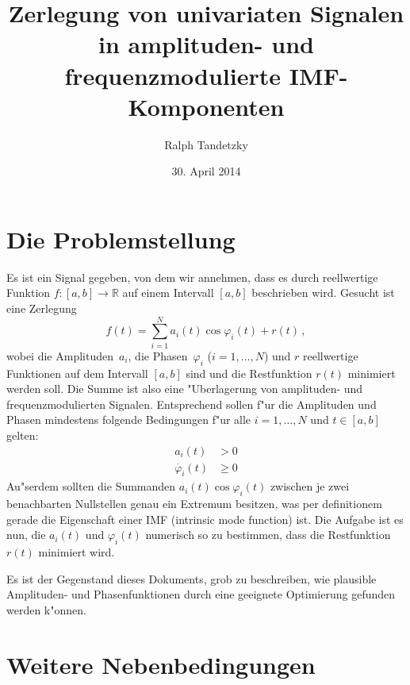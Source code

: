 \documentclass[a4paper]{scrartcl}
\newcommand{\R}{{\mathbb{R}}}
\newcommand{\pphi}{{\varphi}}
\begin{document}

\title{Zerlegung von univariaten Signalen in amplituden- und frequenzmodulierte IMF-Komponenten}
\author{Ralph Tandetzky}
\date{30. April 2014}
\maketitle


\section{Die Problemstellung}

Es ist ein Signal gegeben, von dem wir annehmen, dass es durch reellwertige Funktion $f:[a,b]\to\R$ auf einem Intervall $[a,b]$ beschrieben wird. 
Gesucht ist eine Zerlegung
$$ f(t) = \sum_{i=1}^N a_i(t)\cos\pphi_i(t) + r(t)\,, $$
wobei die Amplituden~$a_i$, die Phasen~$\pphi_i$ ($i=1,\dotsc,N$) und $r$ reellwertige Funktionen auf dem Intervall $[a,b]$ sind und die Restfunktion $r(t)$ minimiert werden soll. 
Die Summe ist also eine "Uberlagerung von amplituden- und frequenzmodulierten Signalen. 
Entsprechend sollen f"ur die Amplituden und Phasen mindestens folgende Bedingungen f"ur alle $i=1,\dotsc,N$ und $t\in[a,b]$ gelten:
\begin{align*}
  a_i(t) &> 0 \\
  \dot{\pphi_i}(t) &\ge 0
\end{align*}
Au"serdem sollten die Summanden $a_i(t)\cos\pphi_i(t)$ zwischen je zwei benachbarten Nullstellen genau ein Extremum besitzen, was per definitionem gerade die Eigenschaft einer IMF (intrinsic mode function) ist. 
Die Aufgabe ist es nun, die $a_i(t)$ und $\pphi_i(t)$ numerisch so zu bestimmen, dass die Restfunktion $r(t)$ minimiert wird. 

Es ist der Gegenstand dieses Dokuments, grob zu beschreiben, wie plausible Amplituden- und Phasenfunktionen durch eine geeignete Optimierung gefunden werden k"onnen. 

\section{Weitere Nebenbedingungen}
\end{document}
